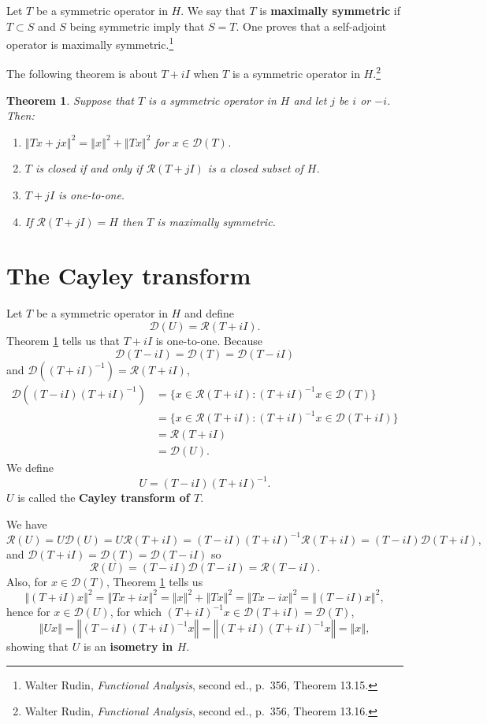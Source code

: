 \documentclass{article}
\newcommand{\norm}[1]{\left\Vert #1 \right\Vert}
\newtheorem{theorem}{Theorem}
\theoremstyle{definition}
\begin{document}
Let $T$ be a symmetric operator in $H$. We say that $T$ is \textbf{maximally symmetric} if 
$T \subset S$ and $S$ being symmetric imply that $S=T$. One proves that a self-adjoint operator
is maximally symmetric.\footnote{Walter
Rudin, {\em Functional Analysis}, second ed., p.~356, Theorem 13.15.}


The following theorem is about $T+iI$ when $T$ is a symmetric operator in $H$.\footnote{Walter
Rudin, {\em Functional Analysis}, second ed., p.~356, Theorem 13.16.}

\begin{theorem}
Suppose that $T$ is a symmetric operator in $H$ and let $j$ be $i$ or $-i$. Then:
\begin{enumerate}
\item $\norm{Tx+jx}^2=\norm{x}^2 + \norm{Tx}^2$ for $x \in \mathscr{D}(T)$.
\item $T$ is closed if and only if $\mathscr{R}(T+jI)$ is a closed subset of $H$.
\item $T+jI$ is one-to-one.
\item If $\mathscr{R}(T+jI)=H$ then $T$ is maximally symmetric.
\end{enumerate}
\label{iI}
\end{theorem}


\section{The Cayley transform}
Let $T$ be a symmetric operator in $H$ and define
\[
\mathscr{D}(U) = \mathscr{R}(T+iI).
\] 
Theorem \ref{iI} tells us that $T+iI$ is one-to-one. Because
\[
\mathscr{D}(T-iI)=\mathscr{D}(T)=\mathscr{D}(T-iI)
\]
and $\mathscr{D}((T+iI)^{-1})=\mathscr{R}(T+iI)$,
\begin{align*}
\mathscr{D}((T-iI)(T+iI)^{-1})&=\{x \in \mathscr{R}(T+iI): (T+iI)^{-1}x \in \mathscr{D}(T)\}\\
&=\{x \in \mathscr{R}(T+iI): (T+iI)^{-1}x \in \mathscr{D}(T+iI)\}\\
&=\mathscr{R}(T+iI)\\
&=\mathscr{D}(U).
\end{align*}
We define
\[
U = (T-iI)(T+iI)^{-1}.
\]
$U$ is called the \textbf{Cayley transform of $T$}.

We have
\[
\mathscr{R}(U) = U\mathscr{D}(U) = U\mathscr{R}(T+iI)=(T-iI)(T+iI)^{-1}\mathscr{R}(T+iI)
=(T-iI)\mathscr{D}(T+iI),
\]
and $\mathscr{D}(T+iI)=\mathscr{D}(T)=\mathscr{D}(T-iI)$ so
\[
\mathscr{R}(U) = (T-iI) \mathscr{D}(T-iI) = \mathscr{R}(T-iI).
\]
Also, for $x \in \mathscr{D}(T)$, Theorem \ref{iI} tells us
\[
\norm{(T+iI)x}^2 = \norm{Tx+ix}^2 = \norm{x}^2+\norm{Tx}^2=
\norm{Tx-ix}^2 = \norm{(T-iI)x}^2,
\]
hence for $x \in \mathscr{D}(U)$, for which $(T+iI)^{-1}x \in \mathscr{D}(T+iI)=\mathscr{D}(T)$,
\[
\norm{Ux} = \norm{(T-iI)(T+iI)^{-1}x}
=\norm{(T+iI)(T+iI)^{-1}x}
=\norm{x},
\]
showing that $U$ is an \textbf{isometry in $H$}.
\end{document}
